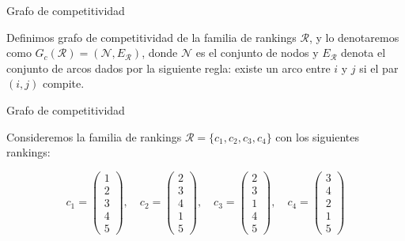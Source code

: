 \documentclass[10pt,hyperref={unicode}]{beamer}
\begin{document}
	\begin{frame}{Grafo de competitividad}
		\begin{defi}
			Definimos grafo de competitividad de la familia de rankings $\mathcal{R}$, y lo denotaremos como $G_c(\mathcal{R}) = (\mathcal{N}, E_\mathcal{R})$, donde $\mathcal{N}$ es el conjunto de nodos y $E_\mathcal{R}$ denota el conjunto de arcos dados por la siguiente regla: existe un arco entre $i$ y $j$ si el par $(i,j)$ compite.
		\end{defi}
	\end{frame}
	
	\begin{frame}{Grafo de competitividad}
		\begin{ejemplo}
			Consideremos la familia de rankings $\mathcal{R} = \{c_1, c_2, c_3, c_4\}$ con los siguientes rankings:
			
			\begin{equation*}
			c_1 = \left( \begin{array}{c}
			1 \\
			2 \\
			3 \\
			4 \\
			5
			\end{array} \right), \quad
			c_2 = \left( \begin{array}{c}
			2 \\
			3 \\
			4 \\
			1 \\
			5
			\end{array} \right), \quad
			c_3 = \left( \begin{array}{c}
			2 \\
			3 \\
			1 \\
			4 \\
			5
			\end{array} \right), \quad
			c_4 = \left( \begin{array}{c}
			3 \\
			4 \\
			2 \\
			1 \\
			5
			\end{array} \right)
			\end{equation*}
		
		\end{ejemplo}
	\end{frame}
	
\end{document}

